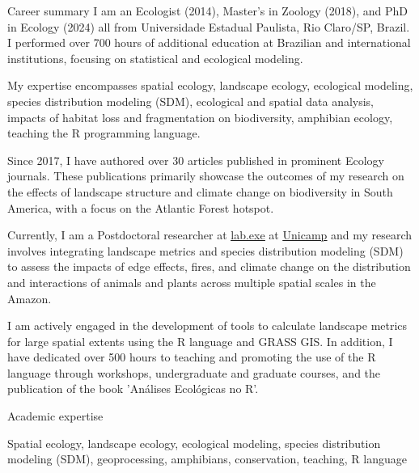 \documentclass{resume}
\begin{document}

\begin{rSection}{Career summary}
I am an Ecologist (2014), Master's in Zoology (2018), and PhD in Ecology (2024) all from Universidade Estadual Paulista, Rio Claro/SP, Brazil. I performed over 700 hours of additional education at Brazilian and international institutions, focusing on statistical and ecological modeling. 

My expertise encompasses spatial ecology, landscape ecology, ecological modeling, species distribution modeling (SDM), ecological and spatial data analysis, impacts of habitat loss and fragmentation on biodiversity, amphibian ecology, teaching the R programming language. 

Since 2017, I have authored over 30 articles published in prominent Ecology journals. These publications primarily showcase the outcomes of my research on the effects of landscape structure and climate change on biodiversity in South America, with a focus on the Atlantic Forest hotspot.

Currently, I am a Postdoctoral researcher at \href{https://www.mathiasmpires.net.br/index.html}{\underline{lab.exe}} at \href{https://unicamp.br/}{\underline{Unicamp}} and my research involves integrating landscape metrics and species distribution modeling (SDM) to assess the impacts of edge effects, fires, and climate change on the distribution and interactions of animals and plants across multiple spatial scales in the Amazon.

I am actively engaged in the development of tools to calculate landscape metrics for large spatial extents using the R language and GRASS GIS. In addition, I have dedicated over 500 hours to teaching and promoting the use of the R language through workshops, undergraduate and graduate courses, and the publication of the book 'Análises Ecológicas no R'.
\end{rSection}


\begin{rSection}{Academic expertise}

Spatial ecology, landscape ecology, ecological modeling, species distribution modeling (SDM), geoprocessing, amphibians, conservation, teaching, R language

\end{rSection}
\end{document}
